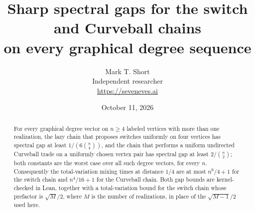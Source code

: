 \documentclass[11pt]{article}
\title{Sharp spectral gaps for the switch and Curveball chains\\on every graphical degree sequence}
\author{Mark T. Short\\[2pt]\small Independent researcher\\\small\url{https://seveneves.ai}}
\date{October 11, 2026}
\numberwithin{equation}{section}
\theoremstyle{definition}
\theoremstyle{remark}
\begin{document}
\maketitle
\begin{abstract}
For every graphical degree vector on $n\ge4$ labeled vertices with more than
one realization, the lazy chain that proposes switches uniformly on four
vertices has spectral gap at least $1/(6\binom n4)$, and the chain that
performs a uniform undirected Curveball trade on a uniformly chosen vertex
pair has spectral gap at least $2/\binom n2$; both constants are the worst
case over all such degree vectors, for every $n$. Consequently the
total-variation mixing times at distance $1/4$ are at most $n^6/4+1$ for the
switch chain and $n^4/16+1$ for the Curveball chain. Both gap bounds are
kernel-checked in Lean, together with a total-variation bound for the switch
chain whose prefactor is $\sqrt M/2$, where $M$ is the number of
realizations, in place of the $\sqrt{M-1}/2$ used here.
\end{abstract}












\end{document}
